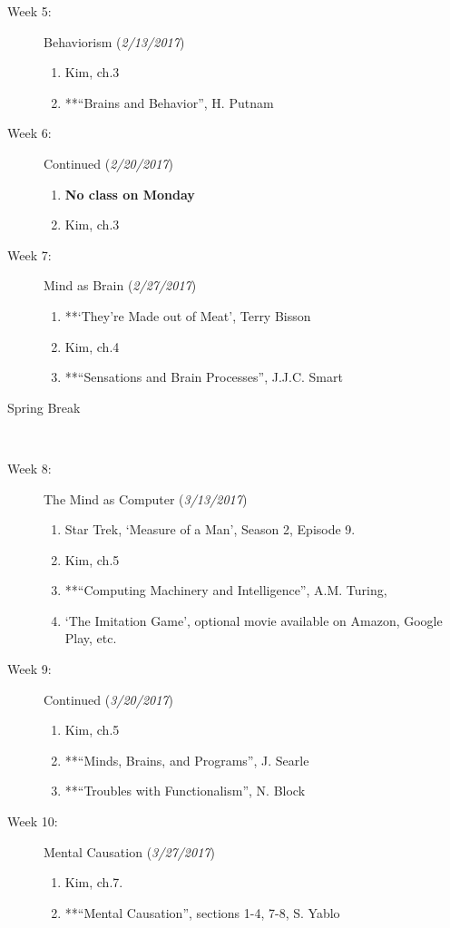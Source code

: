 \documentclass[article,oneside]{memoir}
\begin{document}
\begin{description}
\item[Week 5: ] Behaviorism  (\emph{2/13/2017})
\begin{enumerate}
\item Kim, ch.3
\item **``Brains and Behavior'', H. Putnam
 \end{enumerate}
 
\item[Week 6:] Continued  (\emph{2/20/2017})
\begin{enumerate}
\item \textbf{No class on Monday}
\item Kim, ch.3
\end{enumerate}

\item[Week 7:] Mind as Brain (\emph{2/27/2017})
\begin{enumerate}
\item **`They're Made out of Meat', Terry Bisson
\item Kim, ch.4
\item **``Sensations and Brain Processes'', J.J.C. Smart
\end{enumerate}

\item[Spring Break]\


\item[Week 8:] The Mind as Computer (\emph{3/13/2017})
\begin{enumerate}
\item Star Trek, ‘Measure of a Man’, Season 2, Episode 9.
\item Kim, ch.5
\item **``Computing Machinery and Intelligence'', A.M. Turing, 
\item `The Imitation Game', optional movie available on Amazon, Google Play, etc. \end{enumerate}

\item[Week 9:] Continued  (\emph{3/20/2017})
\begin{enumerate}
\item Kim, ch.5
\item**``Minds, Brains, and Programs'', J.  Searle
\item **``Troubles with Functionalism'', N. Block
\end{enumerate}


\item[Week 10:] Mental Causation (\emph{3/27/2017})
\begin{enumerate}
\item Kim, ch.7. 
\item **``Mental Causation'', sections 1-4, 7-8, S. Yablo
\end{enumerate}


\end{description}
\end{document}
